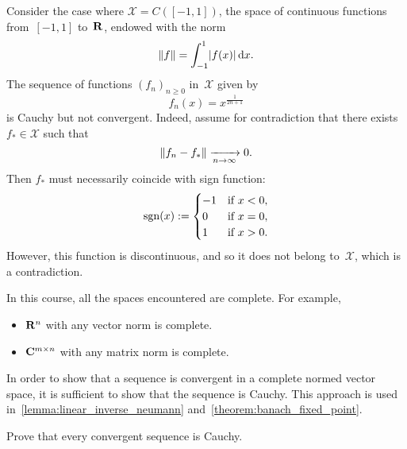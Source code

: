 \begin{example}
    Consider the case where $\mathcal X = C([-1, 1])$,
    the space of continuous functions from~$[-1, 1]$ to~$\mathbf R$,
    endowed with the norm
    \[
        \lVert f\rVert = \int_{-1}^{1} \lvert f(x)\rvert \, \mathrm d x.
    \]
    The sequence of functions $(f_n)_{n\geq 0}$ in~$\mathcal X$ given by
    \begin{equation}
        \label{eq:example_non_complete}
        f_n(x) = x^{\frac{1}{2n+1}}
    \end{equation}
    is Cauchy but not convergent.
    Indeed, assume for contradiction that there exists~$f_* \in \mathcal X$ such that
    \begin{equation}
        \label{eq:example_non_complete_convergence}
        \lVert f_n - f_*\rVert \xrightarrow[n \to \infty]{} 0.
    \end{equation}
    Then $f_*$ must necessarily coincide with sign function:
    \[
        {\rm sgn}(x)
        :=\begin{cases}
            -1 & \text{if } x < 0, \\
            0 & \text{if } x = 0, \\
        1 & \text{if } x > 0. \end{cases}
    \]
    However, this function is discontinuous,
    and so it does not belong to~$\mathcal X$,
    which is a contradiction.
\end{example}

In this course,
all the spaces encountered are complete.
For example,
\begin{itemize}
    \item $\mathbf R^n$ with any vector norm is complete.
    \item $\mathbf C^{m\times n}$ with any matrix norm is complete.
\end{itemize}
In order to show that a sequence is convergent in a complete normed vector space,
it is sufficient to show that the sequence is Cauchy.
This approach is used in~\cref{lemma:linear_inverse_neumann} and~\cref{theorem:banach_fixed_point}.

\begin{exercise}
    Prove that every convergent sequence is Cauchy.
\end{exercise}

